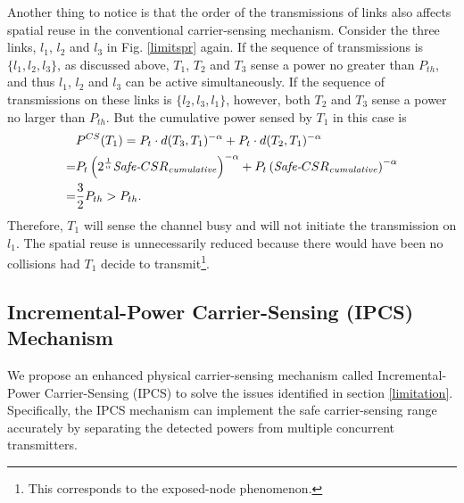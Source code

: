\documentclass[conference]{IEEEtran}
\begin{document}
Another thing to notice is that the order of the transmissions of
links also affects spatial reuse in the conventional carrier-sensing
mechanism. Consider the three links, $l_1$, $l_2$ and $l_3$ in Fig.
\ref{limitspr} again. If the sequence of transmissions is $\{l_1,
l_2,l_3\}$, as discussed above, $T_1$, $T_2$ and $T_3$ sense a power
no greater than $P_{th}$, and thus $l_1$, $l_2$ and $l_3$ can be
active simultaneously. If the sequence of transmissions on these
links is $\{l_2,l_3,l_1\}$, however, both $T_2$ and $T_3$ sense a
power no larger than $P_{th}$. But the cumulative power sensed by
$T_1$ in this case is
\begin{align}
&P^{CS}(T_1)=P_t\cdot
d(T_3,T_1)^{-\alpha}+P_t\cdot d(T_2,T_1)^{-\alpha}\nonumber\\
=&P_t
\left(2^{\frac{1}{\alpha}}\text{\emph{Safe-}}CSR_{\text{\emph{cumulative}}}\right)^{-\alpha}+P_t
\left(\text{\emph{Safe-}}CSR_{\text{\emph{cumulative}}}\right)^{-\alpha}\nonumber\\
=&\frac{3}{2}P_{th}> P_{th}.\nonumber
\end{align}
Therefore, $T_1$ will sense the channel busy and will not initiate
the transmission on $l_1$. The spatial reuse is unnecessarily
reduced because there would have been no collisions had $T_1$ decide
to transmit\footnote[8]{This corresponds to the exposed-node
phenomenon.}.



\subsection{Incremental-Power Carrier-Sensing (IPCS) Mechanism}
We propose an enhanced physical carrier-sensing mechanism called
Incremental-Power Carrier-Sensing (IPCS) to solve the issues
identif\/ied in section \ref{limitation}. Specif\/ically, the IPCS
mechanism can implement the safe carrier-sensing range accurately by
separating the detected powers from multiple concurrent
transmitters.
\end{document}
